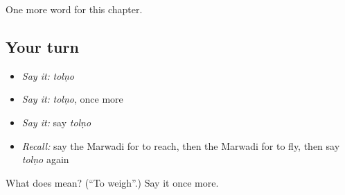 \begin{grammarlens}[title={What you've built}]
One more word for this chapter.
\end{grammarlens}

\subsection*{Your turn}
\begin{itemize}
\raggedright
  \item \emph{Say it:} \emph{tolṇo}
  \item \emph{Say it:} \emph{tolṇo}, once more
  \item \emph{Say it:} say \emph{tolṇo}
  \item \emph{Recall:} say the Marwadi for to reach, then the Marwadi for to fly, then say \emph{tolṇo} again
\end{itemize}

\begin{tcolorbox}[breakable,colback=teal!4,colframe=teal!35!black,title={Before you move on}]
What does  mean? (\textquotedblleft{}To weigh\textquotedblright{}.) Say it once more.
\end{tcolorbox}
